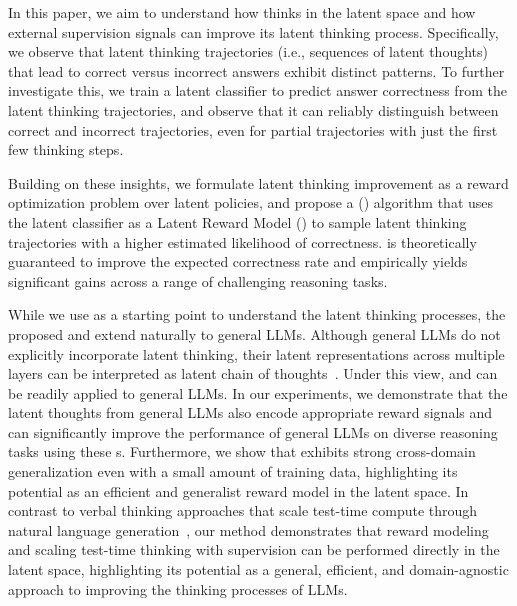 \documentclass{article} %
\begin{document}
In this paper, we aim to understand how \LRLM thinks in the latent space and how external supervision signals can improve its latent thinking process. 
%
Specifically, we observe that latent thinking trajectories (i.e., sequences of latent thoughts) that lead to correct versus incorrect answers exhibit distinct patterns. 
%
To further investigate this, we train a latent classifier to predict answer correctness from the latent thinking trajectories, and observe that it can reliably distinguish between correct and incorrect trajectories, even for partial trajectories with just the first few thinking steps.

Building on these insights, we formulate latent thinking improvement as a reward optimization problem over latent policies, and propose a \LatentThinkingOptimization (\LTO) algorithm that uses the latent classifier as a Latent Reward Model (\LRM) to sample latent thinking trajectories with a higher estimated likelihood of correctness. \LTO is theoretically guaranteed to improve the expected correctness rate and empirically yields significant gains across a range of challenging reasoning tasks. 

While we use \LRLM as a starting point to understand the latent thinking processes, the proposed \LRM and \LTO extend naturally to general LLMs.
%
Although general LLMs do not explicitly incorporate latent thinking, their latent representations across multiple layers can be interpreted as latent chain of thoughts~\citep{wang2025latent}.
%
Under this view, \LRM and \LTO can be readily applied to general LLMs.
%
In our experiments, we demonstrate that the latent thoughts from general LLMs also encode appropriate reward signals and \LTO can significantly improve the performance of general LLMs on diverse reasoning tasks using these {\LRM}s.
%
Furthermore, we show that \LRM exhibits strong cross-domain generalization even with a small amount of training data, highlighting its potential as an efficient and generalist reward model in the latent space.
%
In contrast to verbal thinking approaches that scale test-time compute through natural language generation~\citep{guo2025deepseek,muennighoff2025s1}, our method demonstrates that reward modeling and scaling test-time thinking with supervision can be performed directly in the latent space, highlighting its potential as a general, efficient, and domain-agnostic approach to improving the thinking processes of LLMs.

\end{document}
